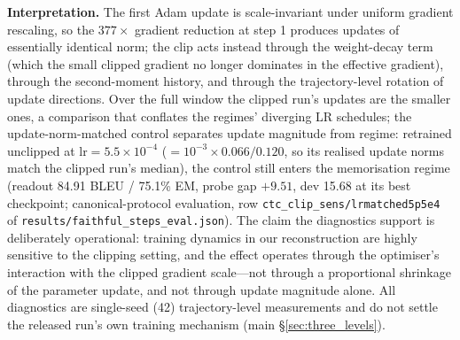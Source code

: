 \documentclass[pdflatex,sn-chicago]{sn-jnl}
\begin{document}
\textbf{Interpretation.} The first Adam update is scale-invariant under uniform gradient rescaling, so the $377\times$ gradient reduction at step 1 produces updates of essentially identical norm; the clip acts instead through the weight-decay term (which the small clipped gradient no longer dominates in the effective gradient), through the second-moment history, and through the trajectory-level rotation of update directions. Over the full window the clipped run's updates are the smaller ones, a comparison that conflates the regimes' diverging LR schedules; the update-norm-matched control separates update magnitude from regime: retrained unclipped at $\mathrm{lr}=5.5\times10^{-4}$ ($=10^{-3}\times 0.066/0.120$, so its realised update norms match the clipped run's median), the control still enters the memorisation regime (readout 84.91 BLEU / 75.1\% EM, probe gap $+9.51$, dev 15.68 at its best checkpoint; canonical-protocol evaluation, row \texttt{ctc\_clip\_sens/lrmatched5p5e4} of \texttt{results/faithful\_steps\_eval.json}). The claim the diagnostics support is deliberately operational: training dynamics in our reconstruction are highly sensitive to the clipping setting, and the effect operates through the optimiser's interaction with the clipped gradient scale---not through a proportional shrinkage of the parameter update, and not through update magnitude alone. All diagnostics are single-seed (42) trajectory-level measurements and do not settle the released run's own training mechanism (main \S\ref{sec:three_levels}).


\end{document}
